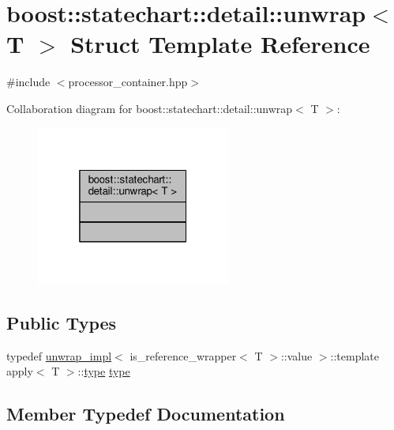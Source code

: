 \hypertarget{structboost_1_1statechart_1_1detail_1_1unwrap}{}\section{boost\+:\+:statechart\+:\+:detail\+:\+:unwrap$<$ T $>$ Struct Template Reference}
\label{structboost_1_1statechart_1_1detail_1_1unwrap}


{\ttfamily \#include $<$processor\+\_\+container.\+hpp$>$}



Collaboration diagram for boost\+:\+:statechart\+:\+:detail\+:\+:unwrap$<$ T $>$\+:
\nopagebreak
\begin{figure}[H]
\begin{center}
\leavevmode
\includegraphics[width=181pt]{structboost_1_1statechart_1_1detail_1_1unwrap__coll__graph}
\end{center}
\end{figure}
\subsection*{Public Types}
\begin{DoxyCompactItemize}
\item 
typedef \mbox{\hyperlink{structboost_1_1statechart_1_1detail_1_1unwrap__impl}{unwrap\+\_\+impl}}$<$ is\+\_\+reference\+\_\+wrapper$<$ T $>$\+::value $>$\+::template apply$<$ T $>$\+::\mbox{\hyperlink{structboost_1_1statechart_1_1detail_1_1unwrap_a6d01c86942e3bc26e9c7adfc5bbc58c6}{type}} \mbox{\hyperlink{structboost_1_1statechart_1_1detail_1_1unwrap_a6d01c86942e3bc26e9c7adfc5bbc58c6}{type}}
\end{DoxyCompactItemize}


\subsection{Member Typedef Documentation}
\mbox{\label{structboost_1_1statechart_1_1detail_1_1unwrap_a6d01c86942e3bc26e9c7adfc5bbc58c6}} 
